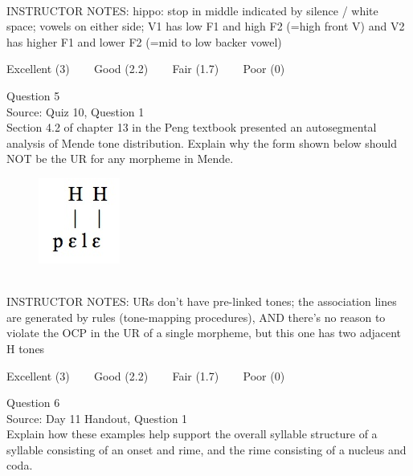\documentclass[12pt]{article}
\begin{document}
~\\
INSTRUCTOR NOTES: hippo: stop in middle indicated by silence / white space; vowels on either side; V1 has low F1 and high F2 (=high front V) and V2 has higher F1 and lower F2 (=mid to low backer vowel)


\vfill
Excellent (3) ~~~ Good (2.2) ~~~ Fair (1.7) ~~~ Poor (0)
\newpage

{\large Question 5}\\

Source: Quiz 10, Question 1\\

Section 4.2 of chapter 13 in the Peng textbook presented an autosegmental analysis of Mende tone distribution. Explain why the form shown below should NOT be the UR for any morpheme in Mende.\\

\begin{figure}[H]
\includegraphics{../images/mende_house_e.png}
\end{figure}

~\\
INSTRUCTOR NOTES: URs don't have pre-linked tones; the association lines are generated by rules (tone-mapping procedures), AND there's no reason to violate the OCP in the UR of a single morpheme, but this one has two adjacent H tones


\vfill
Excellent (3) ~~~ Good (2.2) ~~~ Fair (1.7) ~~~ Poor (0)
\newpage

{\large Question 6}\\

Source: Day 11 Handout, Question 1\\

Explain how these examples help support the overall syllable structure of a syllable consisting of an onset and rime, and the rime consisting of a nucleus and coda.\\
\end{document}
